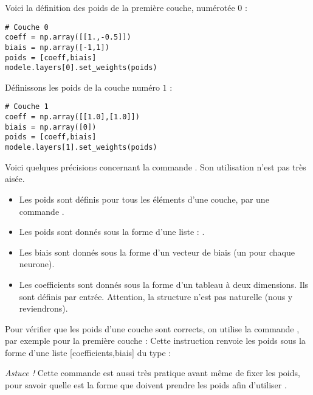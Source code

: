 \documentclass[11pt,class=report,crop=false]{standalone}
\begin{document}
\bigskip

\begin{minipage}{0.55\textwidth}
Voici la définition des poids de la première couche, numérotée $0$ :
\begin{lstlisting}
# Couche 0
coeff = np.array([[1.,-0.5]])
biais = np.array([-1,1])
poids = [coeff,biais]
modele.layers[0].set_weights(poids)
\end{lstlisting}
Définissons les poids de la couche numéro $1$ :
\begin{lstlisting}
# Couche 1
coeff = np.array([[1.0],[1.0]])
biais = np.array([0])
poids = [coeff,biais]
modele.layers[1].set_weights(poids)
\end{lstlisting} 
\end{minipage}
\begin{minipage}{0.40\textwidth}
\end{minipage}


Voici quelques précisions concernant la commande . Son utilisation n'est pas très aisée. 
\begin{itemize}
  \item Les poids sont définis pour tous les éléments d'une couche, par une commande .
  \item Les poids sont donnés sous la forme d'une liste : .
  \item Les biais sont donnés sous la forme d'un vecteur de biais (un pour chaque neurone).
  \item Les coefficients sont donnés sous la forme d'un tableau à deux dimensions. Ils sont définis par entrée. Attention, la structure n'est pas naturelle (nous y reviendrons).
\end{itemize}

Pour vérifier que les poids d'une couche sont corrects, on utilise la commande , par exemple pour la première couche :
Cette instruction renvoie les poids sous la forme d'une liste [coefficients,biais] du type :
\mycenterline{\ci{[  [[ 1.  -0.5]],  [-1.  1.]  ]}}

\emph{Astuce !} Cette commande est aussi très pratique avant même de fixer les poids, pour savoir quelle est la forme que doivent prendre les poids afin d'utiliser .


\end{document}
